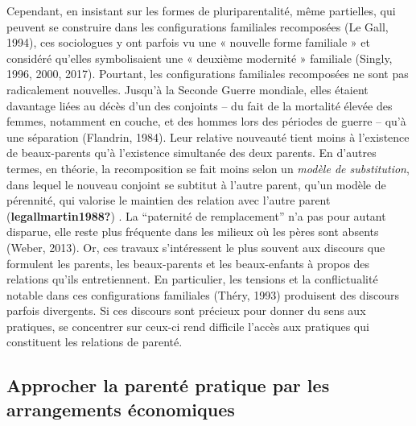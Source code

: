 \documentclass[
  12pt,
]{book}
\begin{document}
Cependant, en insistant sur les formes de pluriparentalité, même
partielles, qui peuvent se construire dans les configurations familiales
recomposées (Le Gall, 1994), ces sociologues y ont parfois vu une «
nouvelle forme familiale » et considéré qu'elles symbolisaient une «
deuxième modernité » familiale (Singly, 1996, 2000, 2017). Pourtant, les
configurations familiales recomposées ne sont pas radicalement
nouvelles. Jusqu'à la Seconde Guerre mondiale, elles étaient davantage
liées au décès d'un des conjoints -- du fait de la mortalité élevée des
femmes, notamment en couche, et des hommes lors des périodes de guerre
-- qu'à une séparation (Flandrin, 1984). Leur relative nouveauté tient
moins à l'existence de beaux-parents qu'à l'existence simultanée des
deux parents. En d'autres termes, en théorie, la recomposition se fait
moins selon un \emph{modèle de substitution}, dans lequel le nouveau
conjoint se subtitut à l'autre parent, qu'un modèle de pérennité, qui
valorise le maintien des relation avec l'autre parent
(\textbf{legallmartin1988?}) . La ``paternité de remplacement'' n'a pas
pour autant disparue, elle reste plus fréquente dans les milieux où les
pères sont absents (Weber, 2013). Or, ces travaux s'intéressent le plus
souvent aux discours que formulent les parents, les beaux-parents et les
beaux-enfants à propos des relations qu'ils entretiennent. En
particulier, les tensions et la conflictualité notable dans ces
configurations familiales (Théry, 1993) produisent des discours parfois
divergents. Si ces discours sont précieux pour donner du sens aux
pratiques, se concentrer sur ceux-ci rend difficile l'accès aux
pratiques qui constituent les relations de parenté.

\subsection{Approcher la parenté pratique par les arrangements
économiques}\label{approcher-la-parentuxe9-pratique-par-les-arrangements-uxe9conomiques}
\end{document}
